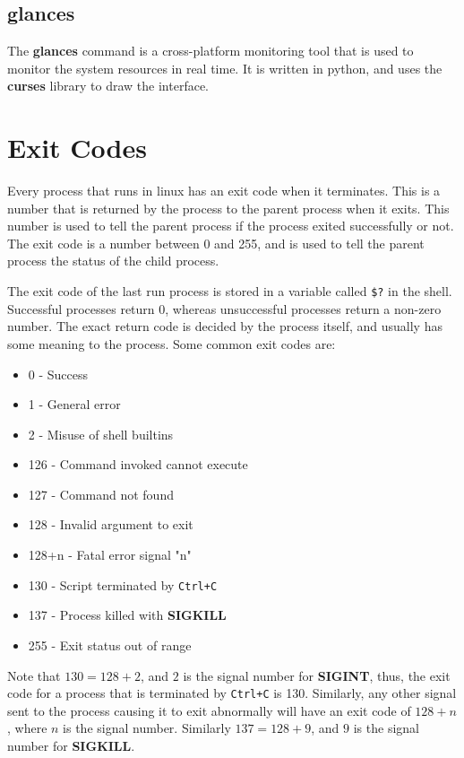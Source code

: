 \subsection{glances}

The \textbf{glances} command is a cross-platform monitoring tool that is
used to monitor the system resources in real time. It is written in python,
and uses the \textbf{curses} library to draw the interface.


\vfill
\pagebreak
\section{Exit Codes}

Every process that runs in linux has an exit code when it terminates.
This is a number that is returned by the process to the parent process
when it exits. This number is used to tell the parent process if the
process exited successfully or not. The exit code is a number between
0 and 255, and is used to tell the parent process the status of the
child process.

The exit code of the last run process is stored in a variable
called \texttt{\$?} in the shell. Successful processes return 0,
whereas unsuccessful processes return a non-zero number.
The exact return code is decided by the process itself, and usually
has some meaning to the process. Some common exit codes are:

\begin{itemize}
  \item 0 - Success
  \item 1 - General error
  \item 2 - Misuse of shell builtins
  \item 126 - Command invoked cannot execute
  \item 127 - Command not found
  \item 128 - Invalid argument to exit
  \item 128+n - Fatal error signal "n"
  \item 130 - Script terminated by \texttt{Ctrl+C}
  \item 137 - Process killed with \textbf{SIGKILL}
  \item 255 - Exit status out of range
\end{itemize}

\begin{remark}
Note that $130=128+2$, and $2$ is the signal number for \textbf{SIGINT},
thus, the exit code for a process that is terminated by \texttt{Ctrl+C}
is 130. Similarly, any other signal sent to the process causing it to
exit abnormally will have an exit code of $128+n$, where $n$ is the signal
number. Similarly $137=128+9$, and $9$ is the signal number for \textbf{SIGKILL}.
\end{remark}

